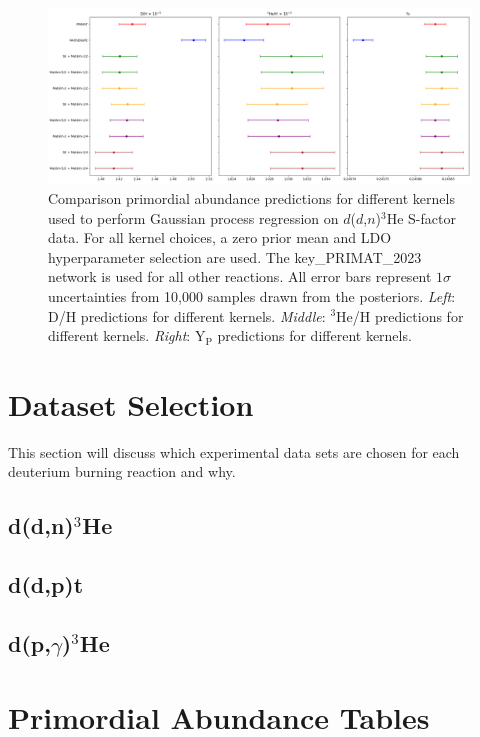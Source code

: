 \documentclass[%
 reprint,
superscriptaddress,
nofootinbib,
 amsmath,amssymb,
 aps,
 pra,
]{revtex4-2}
\begin{document}
\begin{figure}
	\centering
	\includegraphics[width=0.98\linewidth]{Figures/ddhe3n_kernel_comp.png}
	\caption{Comparison primordial abundance predictions for different kernels used to perform Gaussian process regression on $d$($d$,$n$)$^3$He S-factor data.  For all kernel choices, a zero prior mean and LDO hyperparameter selection are used. The key\_PRIMAT\_2023 network is used for all other reactions. All error bars represent $1\sigma$ uncertainties from 10,000 samples drawn from the posteriors. \textit{Left}: D/H predictions for different kernels. \textit{Middle}: $^3$He/H predictions for different kernels. \textit{Right}: Y$_\text{P}$ predictions for different kernels. }
\end{figure}



\section{Dataset Selection}



This section will discuss which experimental data sets are chosen for each deuterium burning reaction and why. 

\subsection{d(d,n)$^3$He}

\subsection{d(d,p)t}

\subsection{d(p,$\gamma$)$^3$He}


\section{Primordial Abundance Tables}
\end{document}
